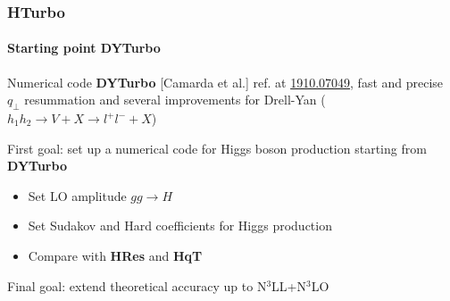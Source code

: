 \documentclass[aspectratio=43]{beamer}
\begin{document}
\begin{frame}

	\frametitle{HTurbo}
	\framesubtitle{Starting point DYTurbo}

	\footnotesize
	
	Numerical code \textbf{DYTurbo} {\color{blue}[Camarda et al.]} ref. at {\color{blue} \href{https://arxiv.org/abs/1910.07049}{1910.07049}}, fast and precise $q_{\perp}$ resummation and several improvements for Drell-Yan ($h_{1}h_{2} \rightarrow V + X \rightarrow l^{+}l^{-} + X$) 
	
	{\color{red}First goal}: set up a numerical code for Higgs boson production starting from  \textbf{DYTurbo}
 
	\begin{itemize}
		\item Set LO amplitude $gg \rightarrow H$
		\item Set Sudakov and Hard coefficients for Higgs production
		\item Compare with \textbf{HRes} and \textbf{HqT}
	\end{itemize}

	\vspace{0.5 cm}

	{\color{red}Final goal}: extend theoretical accuracy up to N$^{3}$LL+N$^{3}$LO

\end{frame}
\end{document}
